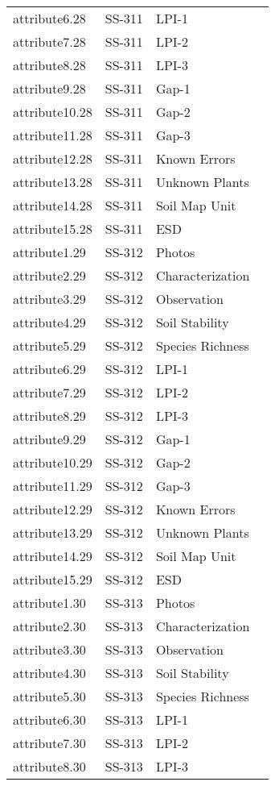 \documentclass[
]{article}
\begin{document}
\begin{longtable}[]{@{}llll@{}}
attribute6.28 & SS-311 & LPI-1 & \\
attribute7.28 & SS-311 & LPI-2 & \\
attribute8.28 & SS-311 & LPI-3 & \\
attribute9.28 & SS-311 & Gap-1 & \\
attribute10.28 & SS-311 & Gap-2 & \\
attribute11.28 & SS-311 & Gap-3 & \\
attribute12.28 & SS-311 & Known Errors & \\
attribute13.28 & SS-311 & Unknown Plants & \\
attribute14.28 & SS-311 & Soil Map Unit & \\
attribute15.28 & SS-311 & ESD & \\
attribute1.29 & SS-312 & Photos & \\
attribute2.29 & SS-312 & Characterization & \\
attribute3.29 & SS-312 & Observation & \\
attribute4.29 & SS-312 & Soil Stability & \\
attribute5.29 & SS-312 & Species Richness & \\
attribute6.29 & SS-312 & LPI-1 & \\
attribute7.29 & SS-312 & LPI-2 & \\
attribute8.29 & SS-312 & LPI-3 & \\
attribute9.29 & SS-312 & Gap-1 & \\
attribute10.29 & SS-312 & Gap-2 & \\
attribute11.29 & SS-312 & Gap-3 & \\
attribute12.29 & SS-312 & Known Errors & \\
attribute13.29 & SS-312 & Unknown Plants & \\
attribute14.29 & SS-312 & Soil Map Unit & \\
attribute15.29 & SS-312 & ESD & \\
attribute1.30 & SS-313 & Photos & \\
attribute2.30 & SS-313 & Characterization & \\
attribute3.30 & SS-313 & Observation & \\
attribute4.30 & SS-313 & Soil Stability & \\
attribute5.30 & SS-313 & Species Richness & \\
attribute6.30 & SS-313 & LPI-1 & \\
attribute7.30 & SS-313 & LPI-2 & \\
attribute8.30 & SS-313 & LPI-3 & \\

\end{longtable}
\end{document}
